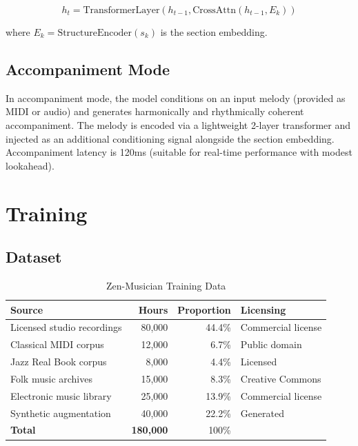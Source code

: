 \documentclass[11pt,a4paper]{article}
\begin{document}
\begin{equation}
    h_t = \text{TransformerLayer}(h_{t-1}, \text{CrossAttn}(h_{t-1}, E_k))
\end{equation}

where $E_k = \text{StructureEncoder}(s_k)$ is the section embedding.

\subsection{Accompaniment Mode}

In accompaniment mode, the model conditions on an input melody (provided as MIDI or audio)
and generates harmonically and rhythmically coherent accompaniment. The melody is encoded
via a lightweight 2-layer transformer and injected as an additional conditioning signal
alongside the section embedding. Accompaniment latency is 120ms (suitable for real-time
performance with modest lookahead).

\section{Training}

\subsection{Dataset}

\begin{table}[H]
\centering
\begin{tabular}{lrrl}
\toprule
\textbf{Source} & \textbf{Hours} & \textbf{Proportion} & \textbf{Licensing} \\
\midrule
Licensed studio recordings & 80,000 & 44.4\% & Commercial license \\
Classical MIDI corpus & 12,000 & 6.7\% & Public domain \\
Jazz Real Book corpus & 8,000 & 4.4\% & Licensed \\
Folk music archives & 15,000 & 8.3\% & Creative Commons \\
Electronic music library & 25,000 & 13.9\% & Commercial license \\
Synthetic augmentation & 40,000 & 22.2\% & Generated \\
\midrule
\textbf{Total} & \textbf{180,000} & 100\% & \\
\bottomrule
\end{tabular}
\caption{Zen-Musician Training Data}
\end{table}
\end{document}
